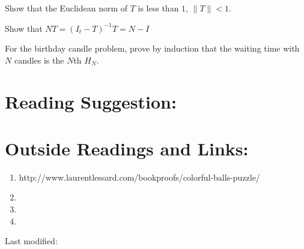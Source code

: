 \documentclass[12pt]{article}
\begin{document}
\begin{solution}
  
\end{solution}

\begin{exercise}
Show
that the
Euclidean norm of \( T \) is less than \( 1 \), \( \| T \| < 1 \).
\end{exercise}
\begin{solution}
  
\end{solution}
\begin{exercise}
   Show that \( NT =
   (I_t - T)^{-1} T = N - I \)
 \end{exercise}
 \begin{solution}
   
 \end{solution}
\begin{solution}
  
\end{solution}

\begin{exercise}
  For the birthday candle problem, prove by induction that the
  waiting time with \( N \)
    candles is the \( N \)th  \( H_N \).
  \end{exercise}
  \begin{solution}
    
  \end{solution}
\hr

\section*{Reading Suggestion:}




\hr

\section*{Outside Readings and Links:}
\begin{enumerate}
    \item
        http://www.laurentlessard.com/bookproofs/colorful-balls-puzzle/
    \item
    \item
    \item
\end{enumerate}

\hr

\mydisclaim \myfooter

Last modified:  \flastmod
\end{document}
